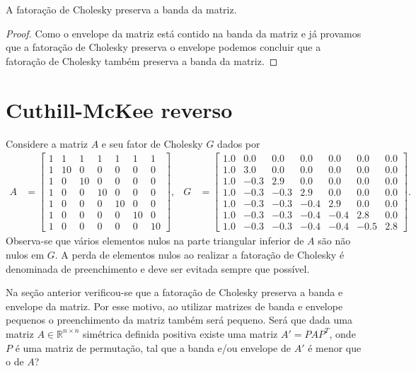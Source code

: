 \begin{prop}
    \label{prop:pres:band}
    A fatoração de Cholesky preserva a banda da matriz.
\end{prop}
\begin{proof}
    Como o envelope da matriz está contido na banda da matriz e já provamos que
    a fatoração de Cholesky preserva o envelope podemos concluir que a fatoração
    de Cholesky também preserva a banda da matriz.
\end{proof}

\section{Cuthill-McKee reverso}
Considere a matriz $A$ e seu fator de Cholesky $G$ dados por
\begin{align*}
    A &= \begin{bmatrix}
        1 &  1 &  1 &  1 &  1 &  1 &  1 \\
        1 & 10 &  0 &  0 &  0 &  0 &  0 \\
        1 &  0 & 10 &  0 &  0 &  0 &  0 \\
        1 &  0 &  0 & 10 &  0 &  0 &  0 \\
        1 &  0 &  0 &  0 & 10 &  0 &  0 \\
        1 &  0 &  0 &  0 &  0 & 10 &  0 \\
        1 &  0 &  0 &  0 &  0 &  0 & 10
    \end{bmatrix}, & G &= \begin{bmatrix}
        1.0 &  0.0 &  0.0 &  0.0 &  0.0 &  0.0 &  0.0 \\
        1.0 &  3.0 &  0.0 &  0.0 &  0.0 &  0.0 &  0.0 \\
        1.0 & -0.3 &  2.9 &  0.0 &  0.0 &  0.0 &  0.0 \\
        1.0 & -0.3 & -0.3 &  2.9 &  0.0 &  0.0 &  0.0 \\
        1.0 & -0.3 & -0.3 & -0.4 &  2.9 &  0.0 &  0.0 \\
        1.0 & -0.3 & -0.3 & -0.4 & -0.4 &  2.8 &  0.0 \\
        1.0 & -0.3 & -0.3 & -0.4 & -0.4 & -0.5 &  2.8
    \end{bmatrix}.
\end{align*}
Observa-se que vários elementos nulos na parte triangular inferior de $A$ são
não nulos em $G$. A perda de elementos nulos ao realizar a fatoração de
Cholesky é denominada de preenchimento e deve ser evitada sempre que possível.

Na seção anterior verificou-se que a fatoração de Cholesky preserva a banda e
envelope da matriz. Por esse motivo, ao utilizar matrizes de banda e
envelope pequenos o preenchimento da matriz também será pequeno. Será que dada
uma matriz $A \in \mathbb{R}^{n \times n}$ simétrica definida positiva existe
uma matriz $A' = P A P^T$, onde $P$ é uma matriz de permutação, tal que a banda
e/ou envelope de $A'$ é menor que o de $A$?

